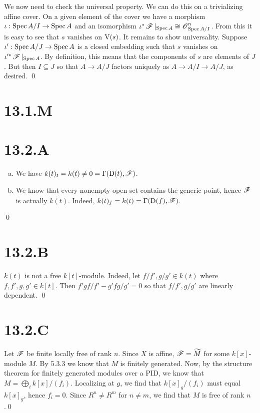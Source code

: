 \documentclass{article}
\begin{document}
We now need to check the universal property. We can do this on a trivializing
affine cover. On a given element of the cover we have a morphism
$\iota: \operatorname{Spec} A/I \to \operatorname{Spec} A$ and an isomorphism $\iota^*\operatorname{\mathscr{F}}|_{\operatorname{Spec} A} \cong \operatorname{\mathscr{O}}_{\operatorname{Spec} A/I}^n$. From this
it is easy to see that $s$ vanishes on
$\operatorname{V}(s)$. It remains to show universality. Suppose
$\iota': \operatorname{Spec} A/J \to \operatorname{Spec} A$ is a closed embedding such that $s$
vanishes on $\iota'^*\operatorname{\mathscr{F}}|_{\operatorname{Spec} A}$. By definition, this means that the
components of $s$ are elements of $J$.
But then $I \subseteq J$ so that $A \to A/J$ factors
uniquely as $A \to A/I \to A/J$, as desired. \qed

\section*{13.1.M}

\section*{13.2.A}
\begin{enumerate}[a.]
    \item We have $k(t)_t=k(t) \neq 0 = \Gamma(\operatorname{D}(t), \operatorname{\mathscr{F}})$.
    \item We know that every nonempty open set contains the generic point, hence
          $\operatorname{\mathscr{F}}$ is actually $\widetilde{k(t)}$. Indeed,
          $k(t)_f=k(t)=\Gamma(\operatorname{D}(f), \operatorname{\mathscr{F}})$.
\end{enumerate}
\qed

\section*{13.2.B}
$k(t)$ is not a free $k[t]$-module. Indeed,
let $f/f', g/g' \in k(t)$ where $f,f',g,g' \in k[t]$. Then
$f'g f/f' - g'f g/g' = 0$ so that $f/f', g/g'$ are linearly dependent.
\qed

\section*{13.2.C}
Let $\operatorname{\mathscr{F}}$ be finite locally free of rank
$n$. Since $X$ is affine,
$\operatorname{\mathscr{F}}=\widetilde{M}$ for some $k[x]$-module
$M$. By 5.3.3 we know that $M$ is
finitely generated. Now, by the structure theorem for finitely generated
modules over a PID, we know that $M = \bigoplus_i k[x]/(f_i)$. Localizing at
$g$, we find that $k[x]_g/(f_i)$ must equal
$k[x]_g$, hence $f_i=0$. Since
$R^n \neq R^m$ for $n \neq m$, we find that
$M$ is free of rank $n$.\qed
\end{document}
